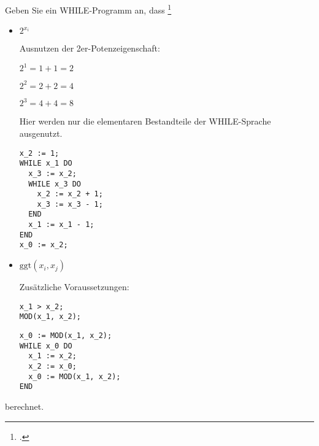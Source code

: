 \documentclass{bschlangaul-aufgabe}
\begin{document}

Geben Sie ein WHILE-Programm an, dass
\footcite[Seite 16]{theo:fs:4}


\begin{itemize}
\item $2^{x_i}$

\begin{bAntwort}
Ausnutzen der 2er-Potenzeigenschaft:

$2^1 = 1 + 1 = 2$

$2^2 = 2 + 2 = 4$

$2^3 = 4 + 4 = 8$

Hier werden nur die elementaren Bestandteile der WHILE-Sprache ausgenutzt.

\begin{verbatim}
x_2 := 1;
WHILE x_1 DO
  x_3 := x_2;
  WHILE x_3 DO
    x_2 := x_2 + 1;
    x_3 := x_3 - 1;
  END
  x_1 := x_1 - 1;
END
x_0 := x_2;
\end{verbatim}
\end{bAntwort}

\item $\text{ggt}(x_i, x_j)$

\begin{bAntwort}
Zusätzliche Voraussetzungen:

\begin{verbatim}
x_1 > x_2;
MOD(x_1, x_2);
\end{verbatim}

\begin{verbatim}
x_0 := MOD(x_1, x_2);
WHILE x_0 DO
  x_1 := x_2;
  x_2 := x_0;
  x_0 := MOD(x_1, x_2);
END
\end{verbatim}
\end{bAntwort}
\end{itemize}

berechnet.
\end{document}
